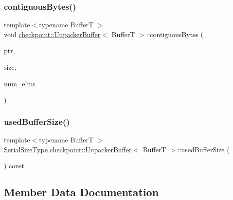 \subsubsection{\texorpdfstring{contiguous\+Bytes()}{contiguousBytes()}}
{\footnotesize\ttfamily template$<$typename BufferT $>$ \\
void \hyperlink{structcheckpoint_1_1_unpacker_buffer}{checkpoint\+::\+Unpacker\+Buffer}$<$ BufferT $>$\+::contiguous\+Bytes (\begin{DoxyParamCaption}\item[{void $\ast$}]{ptr,  }\item[{\hyperlink{namespacecheckpoint_a083f6674da3f94c2901b18c6d238217c}{Serial\+Size\+Type}}]{size,  }\item[{\hyperlink{namespacecheckpoint_a083f6674da3f94c2901b18c6d238217c}{Serial\+Size\+Type}}]{num\+\_\+elms }\end{DoxyParamCaption})}

\mbox{\label{structcheckpoint_1_1_unpacker_buffer_a2d72e0fc79aaa6e062f17b44b74ed0cc}} 
\subsubsection{\texorpdfstring{used\+Buffer\+Size()}{usedBufferSize()}}
{\footnotesize\ttfamily template$<$typename BufferT $>$ \\
\hyperlink{namespacecheckpoint_a083f6674da3f94c2901b18c6d238217c}{Serial\+Size\+Type} \hyperlink{structcheckpoint_1_1_unpacker_buffer}{checkpoint\+::\+Unpacker\+Buffer}$<$ BufferT $>$\+::used\+Buffer\+Size (\begin{DoxyParamCaption}{ }\end{DoxyParamCaption}) const}



\subsection{Member Data Documentation}
\mbox{\label{structcheckpoint_1_1_unpacker_buffer_a0e10a816952c340efd057727e91fe6fa}} 
